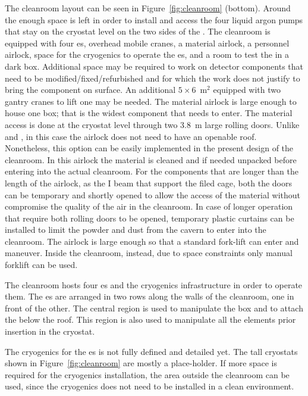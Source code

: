 The cleanroom layout can be seen in Figure~\ref{fig:cleanroom} (bottom).
Around the  enough space is left in order to install and access the four liquid argon pumps that stay on the cryostat level on the two sides of the .
The cleanroom is equipped with four  \coldbox{}es, overhead mobile cranes, a material airlock, a personnel airlock, space for the cryogenics to operate the  \coldbox{}es, and a room to test the  in a dark box.
Additional space may be required to work on detector components that need to be modified/fixed/refurbished and for which the work does not justify to bring the component on surface.
An additional $5\times6$~m$^2$ equipped with two gantry cranes to lift one  may be needed.
The material airlock is large enough to house one  box; that is the widest component that needs to enter.
The material access is done at the cryostat level through two 3.8~m large rolling doors.
Unlike  and , in this case the airlock does not need to have an openable roof.
Nonetheless, this option can be easily implemented in the present design of the cleanroom.
In this airlock the material is cleaned and if needed unpacked before entering into the actual cleanroom.
For the components that are longer than the length of the airlock, as the I beam that support the filed cage, both the doors can be temporary and shortly opened to allow the access of the material without compromise the quality of the air in the cleanroom.
In case of longer operation that require both rolling doors to be opened, temporary plastic curtains can be installed to limit the powder and dust from the cavern to enter into the cleanroom.
The airlock is large enough so that a standard fork-lift can enter and maneuver.
Inside the cleanroom, instead, due to space constraints only manual forklift can be used.

The cleanroom hosts four \coldbox{}es and the cryogenics infrastructure in order to operate them.
The  \coldbox{}es are arranged in two rows along the walls of the cleanroom, one in front of the other.
The central region is used to manipulate the  box and to attach the  below the  \coldbox roof.
This region is also used to manipulate all the elements prior insertion in the cryostat.

The cryogenics for the \coldbox{}es is not fully defined and detailed yet.
The tall cryostats shown in Figure~\ref{fig:cleanroom} are mostly a place-holder.
If more space is required for the cryogenics installation, the area outside the cleanroom can be used, since the cryogenics does not need to be installed in a clean environment.

